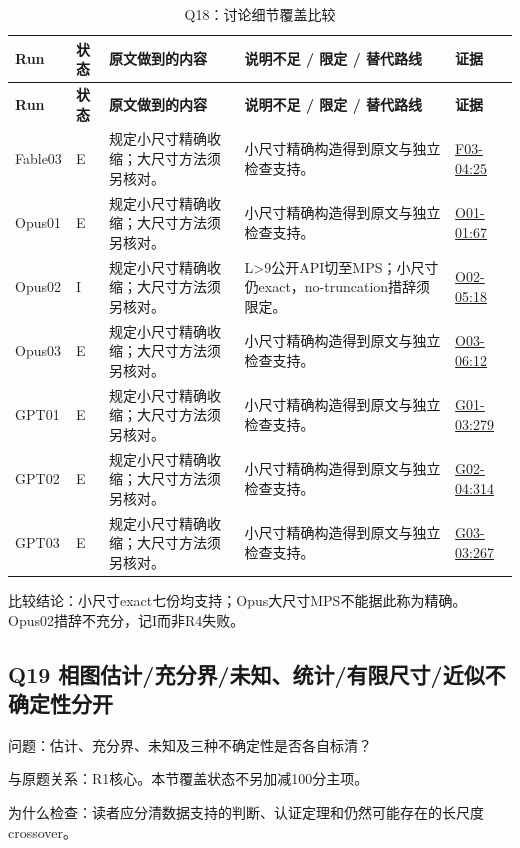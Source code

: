\documentclass[11pt,a4paper]{article}
\begin{document}
{\fontsize{9.0}{12.6}\selectfont
\setlength{\tabcolsep}{2.5pt}
\begin{longtable}{>{\raggedright\arraybackslash}p{}>{\raggedright\arraybackslash}p{}>{\raggedright\arraybackslash}p{}>{\raggedright\arraybackslash}p{}>{\raggedright\arraybackslash}p{}}
\caption{Q18：讨论细节覆盖比较}\\
\toprule
\textbf{Run} & \textbf{状态} & \textbf{原文做到的内容} & \textbf{说明不足 / 限定 / 替代路线} & \textbf{证据}\tabularnewline
\midrule
\endfirsthead
\toprule
\textbf{Run} & \textbf{状态} & \textbf{原文做到的内容} & \textbf{说明不足 / 限定 / 替代路线} & \textbf{证据}\tabularnewline
\midrule
\endhead
{}Fable03 & E & 规定小尺寸精确收缩；大尺寸方法须另核对。 & 小尺寸精确构造得到原文与独立检查支持。 & \hyperref[src:F03-04]{F03-04:25}\tabularnewline
{}Opus01 & E & 规定小尺寸精确收缩；大尺寸方法须另核对。 & 小尺寸精确构造得到原文与独立检查支持。 & \hyperref[src:O01-01]{O01-01:67}\tabularnewline
{}Opus02 & I & 规定小尺寸精确收缩；大尺寸方法须另核对。 & L>9公开API切至MPS；小尺寸仍exact，no-truncation措辞须限定。 & \hyperref[src:O02-05]{O02-05:18}\tabularnewline
{}Opus03 & E & 规定小尺寸精确收缩；大尺寸方法须另核对。 & 小尺寸精确构造得到原文与独立检查支持。 & \hyperref[src:O03-06]{O03-06:12}\tabularnewline
{}GPT01 & E & 规定小尺寸精确收缩；大尺寸方法须另核对。 & 小尺寸精确构造得到原文与独立检查支持。 & \hyperref[src:G01-03]{G01-03:279}\tabularnewline
{}GPT02 & E & 规定小尺寸精确收缩；大尺寸方法须另核对。 & 小尺寸精确构造得到原文与独立检查支持。 & \hyperref[src:G02-04]{G02-04:314}\tabularnewline
{}GPT03 & E & 规定小尺寸精确收缩；大尺寸方法须另核对。 & 小尺寸精确构造得到原文与独立检查支持。 & \hyperref[src:G03-03]{G03-03:267}\tabularnewline
\bottomrule
\end{longtable}
}
比较结论：小尺寸exact七份均支持；Opus大尺寸MPS不能据此称为精确。Opus02措辞不充分，记I而非R4失败。

\clearpage
\subsection{Q19 相图估计/充分界/未知、统计/有限尺寸/近似不确定性分开}
\label{aspect:Q19}
问题：估计、充分界、未知及三种不确定性是否各自标清？

与原题关系：R1核心。本节覆盖状态不另加减100分主项。

为什么检查：读者应分清数据支持的判断、认证定理和仍然可能存在的长尺度 crossover。
\end{document}
